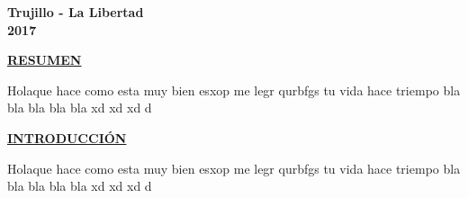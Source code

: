 \documentclass[a4paper, 12pt]{report}
\begin{document}
\vskip 3cm
\begin{center}    
	{\bf {\fontsize{14}{16.8}\selectfont Trujillo - La Libertad
	\\ 2017 }}
\end{center} 
\newpage
\pagestyle{plain}
\doublespacing
{}
\vspace*{6em}
\begin{center}
{\bf{\large{\underline{RESUMEN}}}}
\end{center}
\begin{justify}
Holaque hace como esta muy bien esxop me legr qurbfgs tu vida hace triempo bla bla bla bla bla xd xd xd d
\end{justify}
\newpage



\vspace*{6em}
\begin{center}
{\bf{\large{\underline{INTRODUCCI\'ON}}}}
\end{center}
\begin{justify}
Holaque hace como esta muy bien esxop me legr qurbfgs tu vida hace triempo bla bla bla bla bla xd xd xd d
\end{justify}
\newpage


\singlespacing
\renewcommand{\contentsname}{\centering\bf{\large{{\'INDICE GENERAL}}}}
\renewcommand{\listfigurename}{\centering\bf{\large{{LISTA DE TABLAS}}}}
\renewcommand{\listtablename}{\centering\bf{\large{{LISTA DE FIGURAS}}}}

\tableofcontents    %
\listoffigures      %
\listoftables       %

\doublespacing
\vspace*{5em}
\end{document}
